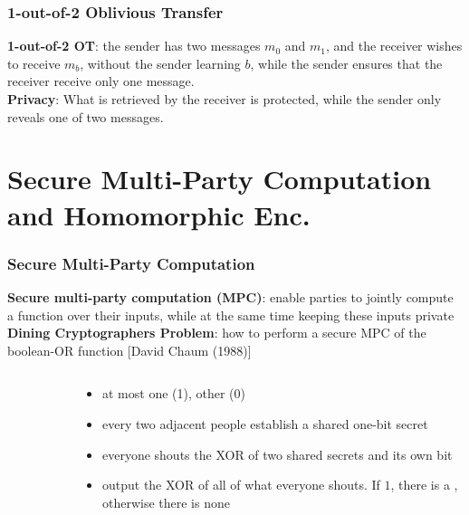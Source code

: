 \begin{frame}\frametitle{1-out-of-2 Oblivious Transfer}
\textbf{1-out-of-2 OT}: the sender has two messages $m_0$ and $m_1$, and the receiver  wishes to receive $m_b$, without the sender learning $b$, while the sender ensures that the receiver receive only one message. \\
\textbf{Privacy}: What is retrieved by the receiver is protected, while the sender only reveals one of two messages.
\begin{figure}
\begin{center}

\end{center}
\end{figure}
\end{frame}
\section{Secure Multi-Party Computation and Homomorphic Enc.}
\begin{frame}\frametitle{Secure Multi-Party Computation}
\textbf{Secure multi-party computation (MPC)}: enable parties to jointly compute a function over their inputs, while at the same time keeping these inputs private\\
\textbf{Dining Cryptographers Problem}: how to perform a secure MPC of the boolean-OR function [David Chaum (1988)]
\begin{columns}
\begin{column}{4cm}
\begin{figure}
\begin{center}

\end{center}
\end{figure}
\end{column}
\begin{column}{6cm}
\begin{itemize}
\item at most one {\color{red} \LARGE \Gentsroom} (1), other {\color{blue} \LARGE \Gentsroom} (0)
\item every two adjacent people establish a shared one-bit secret
\item everyone shouts the XOR of two shared secrets and its own bit
\item output the XOR of all of what everyone shouts. If $1$, there is a {\color{red} \LARGE \Gentsroom}, otherwise there is none
\end{itemize}
\end{column}
\end{columns}
\end{frame}
